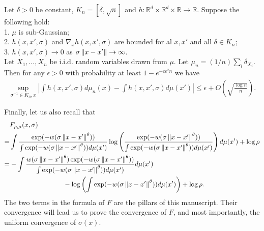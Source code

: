 \documentclass[10pt]{article}
\begin{document}
\begin{lemma} \label{approx_lemma}
  Let $\delta>0$ be constant, $K_n = [\delta,\sqrt{n}]$ and $h: \mathbb{R}^d \times \mathbb{R}^d \times \mathbb{R} \to \mathbb{R}$. Suppose the following hold: \\
  1. $\mu$ is sub-Gaussian; \\
  2. $h(x,x',\sigma)$ and $\nabla_x h(x,x',\sigma)$ are bounded for al $x,x'$ and all $\delta \in K_n$;\\
  3. $h(x,x',\sigma) \to 0$ as $\sigma\left\lVert x-x'\right\rVert \to \infty$.\\
  Let $X_1,\dots,X_n$ be i.i.d. random variables drawn from $\mu$. Let $\mu_n = (1/n)\sum_i \delta_{X_i}$. Then for any $\epsilon > 0$ with probability at least $1 - e^{-c\epsilon^2n}$ we have
  \begin{align}
    \sup_{\sigma^{-1} \in K_n,x} \left|\int h(x,x',\sigma)d\mu_n(x) - \int h(x,x',\sigma)d\mu(x')\right| \leq \epsilon + O\left(\sqrt{\frac{\log n}{n}}\right).
  \end{align}
\end{lemma}
Finally, let us also recall that
\begin{align} \label{big_F_formula}
    & F_{\rho,\mu}(x,\sigma) \nonumber                                                                                                                                                                                                                    \\
  = & \int \frac{\exp(-w(\sigma\left\lVert x-x'\right\rVert^{\theta}))}{\int \exp(-w(\sigma\left\lVert x-x'\right\rVert^{\theta})) d\mu(x')} \log\left(\frac{\exp(-w(\sigma\left\lVert x-x'\right\rVert^{\theta}))}{\int \exp(-w(\sigma\left\lVert x-x'\right\rVert^{\theta})) d\mu(x')}\right)d\mu(x') + \log \rho \nonumber \\
  = & -\int \frac{w(\sigma\left\lVert x-x'\right\rVert^{\theta})\exp(-w(\sigma\left\lVert x-x'\right\rVert^{\theta}))}{\int \exp(-w(\sigma\left\lVert x-x'\right\rVert^{\theta})) d\mu(x')} d\mu(x') \nonumber                                                                                               \\
    & \qquad \qquad \qquad \qquad - \log \left(\int \exp(-w(\sigma\left\lVert x-x'\right\rVert^{\theta}))d\mu(x')\right)  + \log \rho.
\end{align}
The two terms in the formula of $F$ are the pillars of this manuscript. Their convergence will lead us to prove the convergence of $F$, and most importantly, the uniform convergence of $\sigma(x)$.
\end{document}

